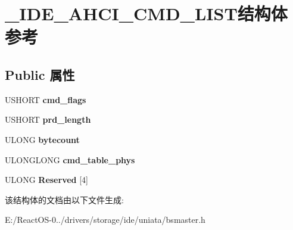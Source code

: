 \hypertarget{struct___i_d_e___a_h_c_i___c_m_d___l_i_s_t}{}\section{\+\_\+\+I\+D\+E\+\_\+\+A\+H\+C\+I\+\_\+\+C\+M\+D\+\_\+\+L\+I\+S\+T结构体 参考}
\label{struct___i_d_e___a_h_c_i___c_m_d___l_i_s_t}
\subsection*{Public 属性}
\begin{DoxyCompactItemize}
\item 
\mbox{\label{struct___i_d_e___a_h_c_i___c_m_d___l_i_s_t_a340b64d741b78f02df32765106554a7f}} 
U\+S\+H\+O\+RT {\bfseries cmd\+\_\+flags}
\item 
\mbox{\label{struct___i_d_e___a_h_c_i___c_m_d___l_i_s_t_afdcf35f97438e924c4b40a3610c65b06}} 
U\+S\+H\+O\+RT {\bfseries prd\+\_\+length}
\item 
\mbox{\label{struct___i_d_e___a_h_c_i___c_m_d___l_i_s_t_af85b69086f58ccb9bbee43cdcb7695af}} 
U\+L\+O\+NG {\bfseries bytecount}
\item 
\mbox{\label{struct___i_d_e___a_h_c_i___c_m_d___l_i_s_t_acd9518de55e0ef9f41a34f5b197f65f6}} 
U\+L\+O\+N\+G\+L\+O\+NG {\bfseries cmd\+\_\+table\+\_\+phys}
\item 
\mbox{\label{struct___i_d_e___a_h_c_i___c_m_d___l_i_s_t_aad8775490bc92aebac2a2474d6693408}} 
U\+L\+O\+NG {\bfseries Reserved} \mbox{[}4\mbox{]}
\end{DoxyCompactItemize}


该结构体的文档由以下文件生成\+:\begin{DoxyCompactItemize}
\item 
E\+:/\+React\+O\+S-\/0../drivers/storage/ide/uniata/bsmaster.\+h\end{DoxyCompactItemize}
